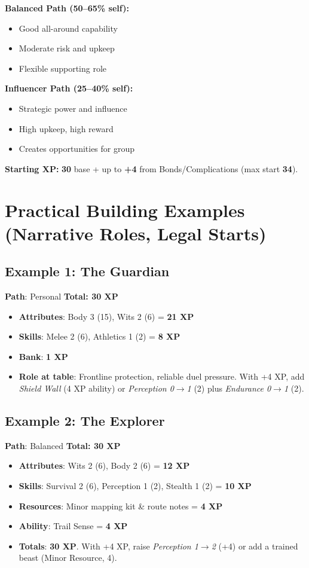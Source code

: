 \begin{multicols}{2}
\begin{tcolorbox}[colback=green!5!white,colframe=green!75!black,title=XP Path Quick Reference,fonttitle=\bfseries]
\textbf{Balanced Path (50--65\% self):}
\begin{itemize}
\item Good all-around capability
\item Moderate risk and upkeep
\item Flexible supporting role
\end{itemize}

\textbf{Influencer Path (25--40\% self):}
\begin{itemize}
\item Strategic power and influence
\item High upkeep, high reward
\item Creates opportunities for group
\end{itemize}

\textbf{Starting XP:} \textbf{30} base \;+\; up to \textbf{+4} from Bonds/Complications (max start \textbf{34}).
\end{tcolorbox}

\section{Practical Building Examples (Narrative Roles, Legal Starts)}

\subsection*{Example 1: The Guardian}
\textbf{Path}: Personal \quad \textbf{Total: 30 XP}
\begin{itemize}
\item \textbf{Attributes}: Body 3 (15), Wits 2 (6) = \textbf{21 XP}
\item \textbf{Skills}: Melee 2 (6), Athletics 1 (2) = \textbf{8 XP}
\item \textbf{Bank}: \textbf{1 XP}
\item \textbf{Role at table}: Frontline protection, reliable duel pressure. With +4 XP, add \emph{Shield Wall} (4 XP ability) or \emph{Perception 0$\to$1} (2) plus \emph{Endurance 0$\to$1} (2).
\end{itemize}

\subsection*{Example 2: The Explorer}
\textbf{Path}: Balanced \quad \textbf{Total: 30 XP}
\begin{itemize}
\item \textbf{Attributes}: Wits 2 (6), Body 2 (6) = \textbf{12 XP}
\item \textbf{Skills}: Survival 2 (6), Perception 1 (2), Stealth 1 (2) = \textbf{10 XP}
\item \textbf{Resources}: Minor mapping kit \& route notes = \textbf{4 XP}
\item \textbf{Ability}: Trail Sense = \textbf{4 XP}
\item \textbf{Totals}: \textbf{30 XP}. With +4 XP, raise \emph{Perception 1$\to$2} (+4) or add a trained beast (Minor Resource, 4).
\end{itemize}


\end{multicols}
